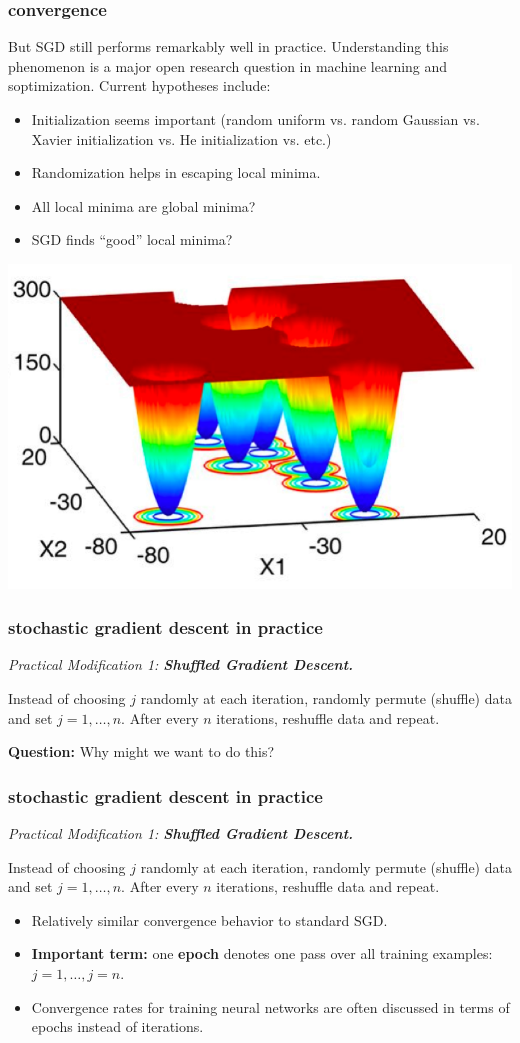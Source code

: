 \documentclass[handout,compress]{beamer}
\begin{document}
\begin{frame}
	\frametitle{convergence}
	\small
	But SGD still performs remarkably well in practice. Understanding this phenomenon is a major open research question in machine learning and soptimization. Current hypotheses include:
	\begin{itemize}
		\item Initialization seems important (random uniform vs. random Gaussian vs. Xavier initialization vs. He initialization vs. etc.)
		\item Randomization helps in  escaping local minima.
		\item All local minima are global minima?
		\item SGD finds ``good'' local minima?
	\end{itemize}
	\begin{center}
	\includegraphics[width=.4\textwidth]{localminglobal.png}
\end{center}
	
\end{frame}
	
	\begin{frame}
		\frametitle{stochastic gradient descent in practice}
		\emph{Practical Modification 1: \textbf{Shuffled Gradient Descent.}}
		
		Instead of choosing $j$ randomly at each iteration, randomly permute (shuffle) data and set $j= 1, \ldots, n$. After every $n$ iterations, reshuffle data and repeat.
		
		\textbf{Question:} Why might we want to do this?
		
	\end{frame}

	\begin{frame}
	\frametitle{stochastic gradient descent in practice}
	\emph{Practical Modification 1: \textbf{Shuffled Gradient Descent.}}
	
			Instead of choosing $j$ randomly at each iteration, randomly permute (shuffle) data and set $j= 1, \ldots, n$. After every $n$ iterations, reshuffle data and repeat.
	
	\begin{itemize}
		\item Relatively similar convergence behavior to standard SGD. 
		\item \textbf{Important term:} one \alert{\textbf{epoch}} denotes one pass over all training examples: $j= 1, \ldots, j=n$. 
		\item Convergence rates for training neural networks are often discussed in terms of epochs instead of iterations. 
	\end{itemize}
\end{frame}
	
\end{document}
